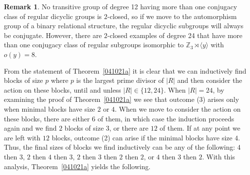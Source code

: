 \documentclass[11pt]{amsart}
\numberwithin{equation}{section}
\theoremstyle{definition}
\newtheorem{remark}[thrm]{Remark}
\newcounter{case}
\def\Z{{\mathbb Z}}
\newcommand{\sg}[1]{\langle{#1}\rangle}
\begin{document}
\begin{remark}
		No transitive group of degree 12 having more than one conjugacy class of regular dicyclic groups is $2$-closed, so if we move to the automorphism group of a binary relational structure, the regular dicyclic subgroups will always be conjugate. However, there are $2$-closed examples of degree 24 that have more than one conjugacy class of regular subgroups isomorphic to $\Z_3 \rtimes \sg{y}$ with $o(y)=8$. 
	\end{remark}
	
	From the statement of Theorem~\ref{041021a} it is clear that we can inductively find blocks of size $p$ where $p$ is the largest prime divisor of $|R|$ and then consider the action on these blocks, until and unless $|R|\in \{12, 24\}$. When $|R|=24$, by examining the proof of Theorem~\ref{041021a} we see that outcome (3) arises only when minimal blocks have size $2$ or $4$. When we move to consider the action on these blocks, there are either $6$ of them, in which case the induction proceeds again and we find $2$ blocks of size $3$, or there are $12$ of them. If at any point we are left with $12$ blocks, outcome (2) can arise if the minimal blocks have size $4$. Thus, the final sizes of blocks we find inductively can be any of the following: $4$ then $3$, $2$ then $4$ then $3$, $2$ then $3$ then $2$ then $2$, or $4$ then $3$ then $2$.
	With this analysis, Theorem~\ref{041021a} yields the following.
\end{document}
